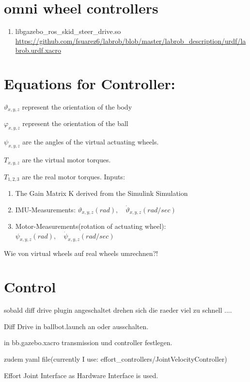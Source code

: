 \documentclass[twoside,colorback,accentcolor=tud4c,11pt]{tudreport}
\begin{document}
\section{omni wheel controllers}
\begin{enumerate}
	\item libgazebo\_ros\_skid\_steer\_drive.so \url{https://github.com/fsuarez6/labrob/blob/master/labrob_description/urdf/labrob.urdf.xacro}
\end{enumerate}
	
	\section{Equations for Controller:}
$\vartheta_{x,y,z}$ represent the orientation of the body

 $\varphi_{x,y,z}$ represent the orientation of the ball
 
  $\psi_{x,y,z}$ are the angles of the virtual actuating wheels.
  
$T_{x,y,z}$ are the virtual motor torques.
		
$T_{1,2,3}$ are the real motor torques.
	Inputs:
\begin{enumerate}
	\item The Gain Matrix K derived from the Simulink Simulation
	\item 	IMU-Measurements: $\vartheta_{x,y,z} (rad), \quad \dot{\vartheta}_{x,y,z} (rad/sec)$
	\item Motor-Measurements(rotation of actuating wheel): $\psi_{x,y,z} (rad), \quad \dot{\psi}_{x,y,z} (rad/sec)$
	\end{enumerate}	
	
	Wie von virtual wheels auf real wheels umrechnen?!
	
	

	

	\section{Control}
	sobald diff drive plugin angeschaltet drehen sich die raeder viel zu schnell ....
	
	Diff Drive in ballbot.launch an oder ausschalten. 
	
	in bb.gazebo.xacro transmission und controller festlegen.
	
	zudem yaml file(currently I use: effort\_controllers/JointVelocityController)
	
	Effort Joint Interface as Hardware Interface is used.
	
\end{document}
